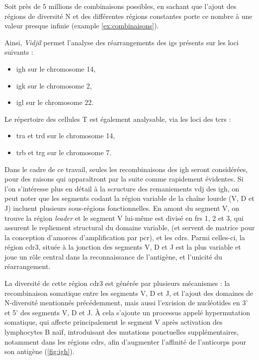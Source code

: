 Soit près de 5 millions de combinaisons possibles, en sachant que l'ajout des régions de diversité N
et des différentes régions constantes porte ce nombre à une valeur presque infinie (example \autoref{ex:combinaisons}).

\vspace{1em}

Ainsi, \textit{Vidjil} permet l'analyse des réarrangements des \glspl{ig} présents sur les loci suivants : 
\begin{itemize}
    \item \gls{igh} sur le chromosome 14, 
    \item \gls{igk} sur le chromosome 2, 
    \item \gls{igl} sur le chromosome 22.
\end{itemize}

\vspace{1em}

Le répertoire des cellules T est également analysable, via les loci des \glspl{tcr} :
\begin{itemize}
    \item \gls{tra} et \gls{trd} sur le chromosome 14, 
    \item \gls{trb} et \gls{trg} sur le chromosome 7.
\end{itemize}



Dans le cadre de ce travail, seules les recombinaisons des \gls{igh} seront considérées,
pour des raisons qui apparaîtront par la suite comme rapidement évidentes.
Si l'on s'intéresse plus en détail à la scructure des remaniements \gls{vdj} des \gls{igh},
on peut noter que les segments codant la région variable de la chaîne lourde (V, D et J)
incluent plusieurs sous-régions fonctionnelles. En amont du segment V, on trouve la région \textit{leader} et 
le segment V lui-même est divisé en \glspl{fr} 1, 2 et 3, qui assurent le repliement structural du domaine variable, 
(et servent de matrice pour la conception d'amorces d'amplification par \gls{pcr}), 
et les \glspl{cdr}. Parmi celles-ci, la région \gls{cdr}3, située à la jonction des segments V, D et J 
est la plus variable et joue un rôle central dans la reconnaissance de l'antigène, et l'unicité du réarrangement.

\vspace{1em}

La diversité de cette région \gls{cdr}3 est générée par plusieurs mécanismes :
la recombinaison somatique entre les segments V, D et J, et l'ajout des domaines de N-diversité 
mentionnés précédemment, mais aussi l'excision de nucléotides en 3' et 5' des segments V, D et J.
À cela s'ajoute un processus appelé hypermutation somatique, qui affecte principalement le segment V 
après activation des lymphocytes B naïf, introduisant des mutations ponctuelles supplémentaires,
notamment dans les régions \glspl{cdr}, afin d'augmenter l'affinité de l'anticorps pour son antigène (\autoref{fig:igh}).

